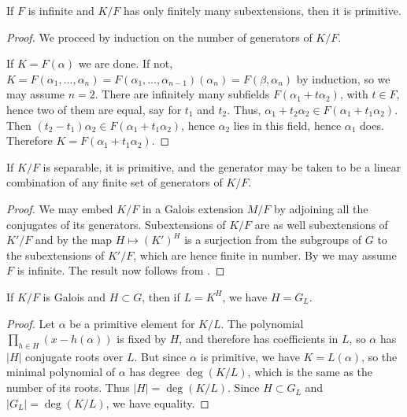 \begin{proposition} If $F$ is infinite and $K/F$ has only finitely many subextensions, then it is
primitive.
\label{gen_prim_elt}
\end{proposition}

\begin{proof} We proceed by induction on the number of generators of $K/F$.

If $K = F(\alpha)$ we are done.  If not, $K = F(\alpha_1, \dots, \alpha_n) =
F(\alpha_1, \dots, \alpha_{n - 1})(\alpha_n) = F(\beta, \alpha_n)$ by
induction, so we may assume $n = 2$.  There are infinitely many subfields
$F(\alpha_1 + t \alpha_2)$, with $t \in F$, hence two of them are equal, say for $t_1$ and
$t_2$.  Thus, $\alpha_1 + t_2 \alpha_2 \in F(\alpha_1 + t_1 \alpha_2)$.  Then
$(t_2 - t_1)\alpha_2 \in F(\alpha_1 + t_1 \alpha_2)$, hence $\alpha_2$ lies in
this field, hence $\alpha_1$ does.  Therefore $K = F(\alpha_1 + t_1
\alpha_2)$. \end{proof}

\begin{corollary} If $K/F$ is separable, it is primitive, and the generator may be
taken to be a linear combination of any finite set of generators of $K/F$.
\label{prim_elt}
\end{corollary}

\begin{proof} We may embed $K/F$ in a Galois extension $M/F$ by adjoining all
the conjugates of its generators.  Subextensions of $K/F$ are as well subextensions
of $K'/F$ and by  the map $H \mapsto (K')^H$ is a surjection
from the subgroups of $G$ to the subextensions of $K'/F$, which are hence
finite in number.  By  we may assume $F$ is infinite.  The
result now follows from . \end{proof}

\begin{corollary}
 If $K/F$ is Galois and $H \subset G$, then if $L = K^H$, we have $H = G_L$.
 \label{fixing_subgroup}
\end{corollary}

\begin{proof}
 Let $\alpha$ be a primitive element for $K/L$.  The polynomial $\prod_{h \in H} (x - h(\alpha))$ is fixed by $H$, and therefore has coefficients in $L$, so $\alpha$ has $|H|$ conjugate roots over $L$.  But since $\alpha$ is primitive, we have $K = L(\alpha)$, so the minimal polynomial of $\alpha$ has degree $\deg(K/L)$, which is the same as the number of its roots.  Thus $|H| = \deg(K/L)$.  Since $H \subset G_L$ and $|G_L| = \deg(K/L)$, we have equality.
\end{proof}


